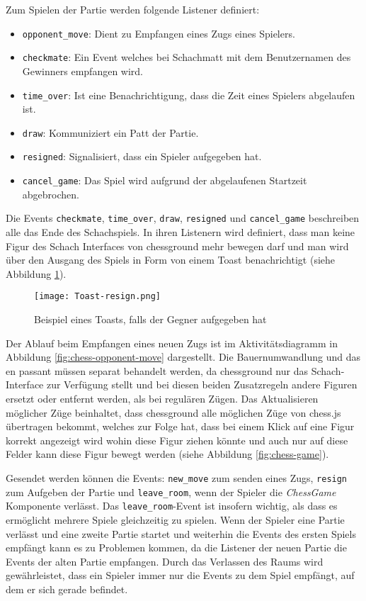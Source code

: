 Zum Spielen der Partie werden folgende Listener definiert:
\begin{itemize}
\item \verb|opponent_move|: Dient zu Empfangen eines Zugs eines Spielers.
\item \verb|checkmate|: Ein Event welches bei Schachmatt mit dem Benutzernamen des Gewinners empfangen wird.
\item \verb|time_over|: Ist eine Benachrichtigung, dass die Zeit eines Spielers abgelaufen ist.
\item \verb|draw|: Kommuniziert ein Patt der Partie.
\item \verb|resigned|: Signalisiert, dass ein Spieler aufgegeben hat.
\item \verb|cancel_game|: Das Spiel wird aufgrund der abgelaufenen Startzeit abgebrochen.
\end{itemize}
Die Events \verb|checkmate|, \verb|time_over|, \verb|draw|, \verb|resigned| und \verb|cancel_game| beschreiben alle das Ende des Schachspiels. In ihren Listenern wird definiert, dass man keine Figur des Schach Interfaces von chessground mehr bewegen darf und man wird über den Ausgang des Spiels in Form von einem Toast benachrichtigt (siehe Abbildung \ref{fig:resign-toast}).

\begin{figure}[h]
\centering
\texttt{[image: Toast-resign.png]}
\caption{Beispiel eines Toasts, falls der Gegner aufgegeben hat}
\label{fig:resign-toast}
\end{figure}

Der Ablauf beim Empfangen eines neuen Zugs ist im Aktivitätsdiagramm in Abbildung \ref{fig:chess-opponent-move} dargestellt. Die Bauernumwandlung und das en passant müssen separat behandelt werden, da chessground nur das Schach-Interface zur Verfügung stellt und bei diesen beiden Zusatzregeln andere Figuren ersetzt oder entfernt werden, als bei regulären Zügen. Das Aktualisieren möglicher Züge beinhaltet, dass chessground alle möglichen Züge von chess.js übertragen bekommt, welches zur Folge hat, dass bei einem Klick auf eine Figur korrekt angezeigt wird wohin diese Figur ziehen könnte und auch nur auf diese Felder kann diese Figur bewegt werden (siehe Abbildung \ref{fig:chess-game}).

Gesendet werden können die Events: \verb|new_move| zum senden eines Zugs, \verb|resign| zum Aufgeben der Partie und \verb|leave_room|, wenn der Spieler die \textit{ChessGame} Komponente verlässt.
Das \verb|leave_room|-Event ist insofern wichtig, als dass es ermöglicht mehrere Spiele gleichzeitig zu spielen. Wenn der Spieler eine Partie verlässt und eine zweite Partie startet und weiterhin die Events des ersten Spiels empfängt kann es zu Problemen kommen, da die Listener der neuen Partie die Events der alten Partie empfangen. Durch das Verlassen des Raums wird gewährleistet, dass ein Spieler immer nur die Events zu dem Spiel empfängt, auf dem er sich gerade befindet.

